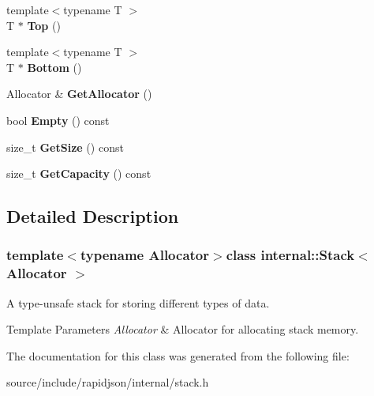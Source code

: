 \begin{DoxyCompactItemize}
\item 
\hypertarget{classinternal_1_1_stack_ab3ed5b4afed3c73c516678516d5e195b}{}{\footnotesize template$<$typename T $>$ }\\T $\ast$ {\bfseries Top} ()\label{classinternal_1_1_stack_ab3ed5b4afed3c73c516678516d5e195b}

\item 
\hypertarget{classinternal_1_1_stack_a10aa1bc716b82cb0a40b3a3b9d5efe87}{}{\footnotesize template$<$typename T $>$ }\\T $\ast$ {\bfseries Bottom} ()\label{classinternal_1_1_stack_a10aa1bc716b82cb0a40b3a3b9d5efe87}

\item 
\hypertarget{classinternal_1_1_stack_ab01f693833dfe136f574d66547623cfa}{}Allocator \& {\bfseries Get\+Allocator} ()\label{classinternal_1_1_stack_ab01f693833dfe136f574d66547623cfa}

\item 
\hypertarget{classinternal_1_1_stack_abf57d1c7b356d8acbbe0e79147ca4b5c}{}bool {\bfseries Empty} () const \label{classinternal_1_1_stack_abf57d1c7b356d8acbbe0e79147ca4b5c}

\item 
\hypertarget{classinternal_1_1_stack_ade4a25fa82950619652a30aa3a807f58}{}size\+\_\+t {\bfseries Get\+Size} () const \label{classinternal_1_1_stack_ade4a25fa82950619652a30aa3a807f58}

\item 
\hypertarget{classinternal_1_1_stack_a61dea1ed780c07bb438d17c581ab0e48}{}size\+\_\+t {\bfseries Get\+Capacity} () const \label{classinternal_1_1_stack_a61dea1ed780c07bb438d17c581ab0e48}

\end{DoxyCompactItemize}


\subsection{Detailed Description}
\subsubsection*{template$<$typename Allocator$>$class internal\+::\+Stack$<$ Allocator $>$}

A type-\/unsafe stack for storing different types of data. 


\begin{DoxyTemplParams}{Template Parameters}
{\em Allocator} & Allocator for allocating stack memory. \\
\hline
\end{DoxyTemplParams}


The documentation for this class was generated from the following file\+:\begin{DoxyCompactItemize}
\item 
source/include/rapidjson/internal/stack.\+h\end{DoxyCompactItemize}
